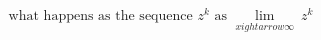 \documentclass[preview]{standalone}
\begin{document}
\begin{align*}
\text{what happens as the sequence } z^k \text{ as } \lim_{x 
ightarrow \infty} \ z^k
\end{align*}
\end{document}

